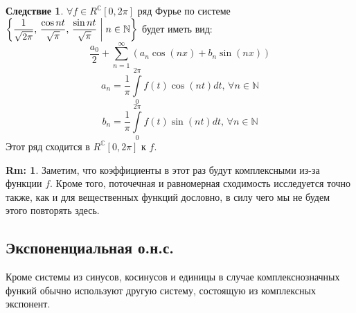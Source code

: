 \documentclass[12pt]{article}
\newcommand{\MC}{\mathbb{C}}
\newcommand{\MN}{\mathbb{N}}
\theoremstyle{definition}
\newtheorem{rem}{Rm:}
\newtheorem{corollary}{Следствие}
\newcommand{\ddsum}[2]{\displaystyle\sum\limits_{#1}^{#2}}
\newcommand{\ddint}[2]{\displaystyle\int\limits_{#1}^{#2}}
\begin{document}
\begin{corollary}
	$\forall f \in R^{\MC}[0,2\pi]$ ряд Фурье по системе $\left\{\dfrac{1}{\sqrt{2\pi}}, \, \dfrac{\cos{nt}}{\sqrt{\pi}}, \, \dfrac{\sin{nt}}{\sqrt{\pi}}  \biggm\vert  n \in \MN  \right\}$ будет иметь вид:
	$$
		\dfrac{a_0}{2} + \ddsum{n = 1}{\infty}\left(a_n \cos{(nx)} + b_n \sin{(nx)}\right)
	$$
	$$
		a_n = \dfrac{1}{\pi}\ddint{0}{2\pi}f(t)\cos{(nt)}dt, \, \forall n \in \MN
	$$
	$$
		b_n = \dfrac{1}{\pi}\ddint{0}{2\pi}f(t)\sin{(nt)}dt, \, \forall n \in \MN
	$$
	Этот ряд сходится в $R^{\MC}[0,2\pi]$ к $f$.
\end{corollary}
\begin{rem}
	Заметим, что коэффициенты в этот раз будут комплексными из-за функции $f$. Кроме того, 	поточечная и равномерная сходимость исследуется точно также, как и для вещественных функций дословно, в силу чего мы не будем этого повторять здесь.
\end{rem}

\subsection*{Экспоненциальная о.н.с.}
Кроме системы из синусов, косинусов и единицы в случае комплекснозначных функий обычно используют другую систему, состоящую из комплексных экспонент.
\end{document}
